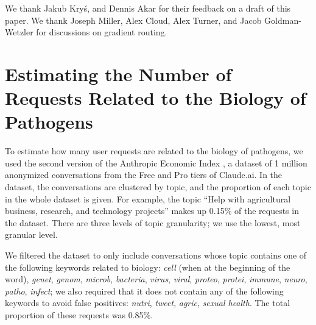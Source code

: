 \documentclass{article}
\theoremstyle{plain}
\theoremstyle{definition}
\theoremstyle{remark}
\begin{document}
We thank Jakub Kryś, and Dennis Akar for their feedback on a draft of this paper. We thank Joseph Miller, Alex Cloud, Alex Turner, and Jacob Goldman-Wetzler for discussions on gradient routing.




\newpage
\appendix

\section{Estimating the Number of Requests Related to the Biology of Pathogens} \label{appendix:estimating-biology-requests}

To estimate how many user requests are related to the biology of pathogens, we used the second version of the Anthropic Economic Index \cite{handa2025economictasksperformedai}, a dataset of 1 million anonymized conversations from the Free and Pro tiers of Claude.ai.
In the dataset, the conversations are clustered by topic, and the proportion of each topic in the whole dataset is given.
For example, the topic ``Help with agricultural business, research, and technology projects'' makes up 0.15\% of the requests in the dataset.
There are three levels of topic granularity; we use the lowest, most granular level.

We filtered the dataset to only include conversations whose topic contains one of the following keywords related to biology: \emph{cell} (when at the beginning of the word), \emph{genet}, \emph{genom}, \emph{microb}, \emph{bacteria}, \emph{virus}, \emph{viral}, \emph{proteo}, \emph{protei}, \emph{immune}, \emph{neuro}, \emph{patho}, \emph{infect}; we also required that it does not contain any of the following keywords to avoid false positives: \emph{nutri}, \emph{tweet}, \emph{agric}, \emph{sexual health}.
The total proportion of these requests was 0.85\%.
\end{document}
